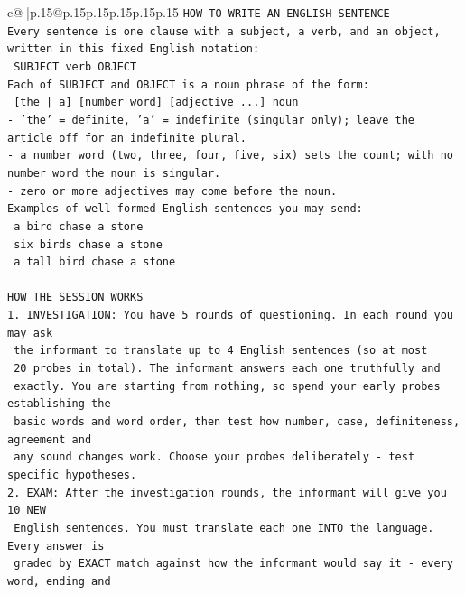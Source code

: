\documentclass{article}
\begin{document}
{\begin{supertabular}{c@{$\;$}|p{.15\linewidth}@{}p{.15\linewidth}p{.15\linewidth}p{.15\linewidth}p{.15\linewidth}p{.15\linewidth}}
{{{\texttt{HOW TO WRITE AN ENGLISH SENTENCE} \\
\texttt{Every sentence is one clause with a subject, a verb, and an object, written in this fixed English notation:} \\
\texttt{    SUBJECT  verb  OBJECT} \\
\texttt{Each of SUBJECT and OBJECT is a noun phrase of the form:} \\
\texttt{    {[}the | a{]}  {[}number word{]}  {[}adjective ...{]}  noun} \\
\texttt{{-} 'the' = definite, 'a' = indefinite (singular only); leave the article off for an indefinite plural.} \\
\texttt{{-} a number word (two, three, four, five, six) sets the count; with no number word the noun is singular.} \\
\texttt{{-} zero or more adjectives may come before the noun.} \\
\texttt{Examples of well{-}formed English sentences you may send:} \\
\texttt{    a bird chase a stone} \\
\texttt{    six birds chase a stone} \\
\texttt{    a tall bird chase a stone} \\
\\ 
\texttt{HOW THE SESSION WORKS} \\
\texttt{1. INVESTIGATION: You have 5 rounds of questioning. In each round you may ask} \\
\texttt{   the informant to translate up to 4 English sentences (so at most} \\
\texttt{   20 probes in total). The informant answers each one truthfully and} \\
\texttt{   exactly. You are starting from nothing, so spend your early probes establishing the} \\
\texttt{   basic words and word order, then test how number, case, definiteness, agreement and} \\
\texttt{   any sound changes work. Choose your probes deliberately {-} test specific hypotheses.} \\
\texttt{2. EXAM: After the investigation rounds, the informant will give you 10 NEW} \\
\texttt{   English sentences. You must translate each one INTO the language. Every answer is} \\
\texttt{   graded by EXACT match against how the informant would say it {-} every word, ending and} \\
}}}
\end{supertabular}}
\end{document}
